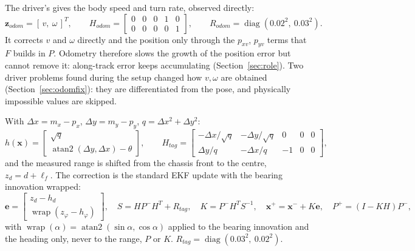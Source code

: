 The driver's  gives the body speed and turn rate, observed directly:
\begin{equation}
  \mathbf z_{odom}=[\,v,\ \omega\,]^T,\qquad
  H_{odom}=\begin{bmatrix}0&0&0&1&0\\0&0&0&0&1\end{bmatrix},\qquad R_{odom}=\operatorname{diag}(0.02^2,\ 0.03^2).
\end{equation}
It corrects $v$ and $\omega$ directly and the position only through the $p_{xv}$, $p_{yv}$ terms that $F$ builds in
$P$. Odometry therefore slows the growth of the position error but cannot remove it: along-track error keeps
accumulating (Section~\ref{sec:role}). Two driver problems found during the setup changed how $v,\omega$ are obtained
(Section~\ref{sec:odomfix}): they are differentiated from the  pose, and physically impossible values are
skipped.

With $\Delta x = m_x-p_x$, $\Delta y = m_y-p_y$, $q=\Delta x^2+\Delta y^2$:
\begin{equation}
h(\mathbf x)=\begin{bmatrix}\sqrt q\\ \operatorname{atan2}(\Delta y,\Delta x)-\theta\end{bmatrix},\qquad
H_{tag}=\begin{bmatrix}-\Delta x/\sqrt q & -\Delta y/\sqrt q & 0&0&0\\ \Delta y/q & -\Delta x/q & -1&0&0\end{bmatrix},
\end{equation}
and the measured range is shifted from the chassis front to the centre, $z_d = d + \ell_f$. The correction is the
standard EKF update with the bearing innovation wrapped:
\begin{equation}
\mathbf e=\begin{bmatrix} z_d - h_d\\ \operatorname{wrap}(z_\varphi-h_\varphi)\end{bmatrix},\quad
S = H P^- H^T + R_{tag},\quad
K = P^- H^T S^{-1},\quad
\mathbf x^+=\mathbf x^-+K\mathbf e,\quad
P^+=(I-KH)P^-,
\end{equation}
with $\operatorname{wrap}(\alpha)=\operatorname{atan2}(\sin\alpha,\cos\alpha)$ applied to the bearing innovation and
the heading only, never to the range, $P$ or $K$. $R_{tag}=\operatorname{diag}(0.03^2,\ 0.02^2)$.

